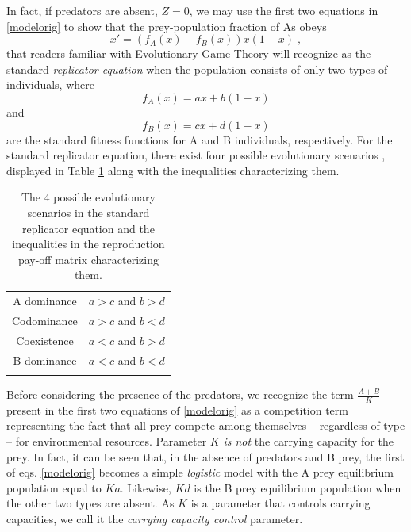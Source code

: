 \documentclass[12pt]{article}
\theoremstyle{definition}
\begin{document}
In fact, if predators are absent, $Z=0$, we may use the first two equations in \eqref{modelorig} to show that the prey-population fraction of As obeys
\begin{equation}  \label{standrep}
	x'= (f_A(x)-f_B(x))x(1-x)\;,
\end{equation}
that readers familiar with Evolutionary Game Theory will recognize as the standard \emph{replicator equation} when the population consists of only two types of individuals, where 
\[f_A(x)= a x+b(1-x)\]
and
\[f_B(x)=c x+d(1-x)\]
are the standard fitness functions for A and B individuals, respectively. For the standard replicator equation, there exist four possible evolutionary scenarios \cite{nowak}, displayed in Table \ref{tab:repsce} along with the inequalities characterizing them.
\begin{table}   
	\begin{tabular}{cc}
		\hline\noalign{\smallskip}
		A dominance& $a>c$ and $b>d$   \\
		\noalign{\smallskip}\hline\noalign{\smallskip}
		Codominance & $a>c$ and $b<d$   \\
		\noalign{\smallskip}\hline\noalign{\smallskip}
		Coexistence & $a<c$ and $b>d$   \\
		\noalign{\smallskip}\hline\noalign{\smallskip}
		B dominance & $a<c$ and $b<d$   \\
		\noalign{\smallskip}\hline \smallskip
	\end{tabular}
	\caption{\label{tab:repsce} The 4 possible evolutionary scenarios in the standard replicator equation and the inequalities in the reproduction pay-off matrix characterizing them.}
\end{table}

Before considering the presence of the predators, we recognize the term $\frac{A + B}{K}$ present in the first two equations of \eqref{modelorig} as a competition term representing the fact that all prey compete among themselves -- regardless of type -- for environmental resources.  Parameter $K$ \emph{is not} the carrying capacity for the prey. In fact, it can be seen that, in the absence of predators and B prey, the first of eqs. \eqref{modelorig} becomes a simple \emph{logistic} model \cite{edel, murray} with the A prey equilibrium population equal to $Ka$. Likewise, $Kd$ is the B prey equilibrium population when the other two types are absent. As $K$ is a parameter that controls carrying capacities, we call it the \emph{carrying capacity control} parameter.
\end{document}
